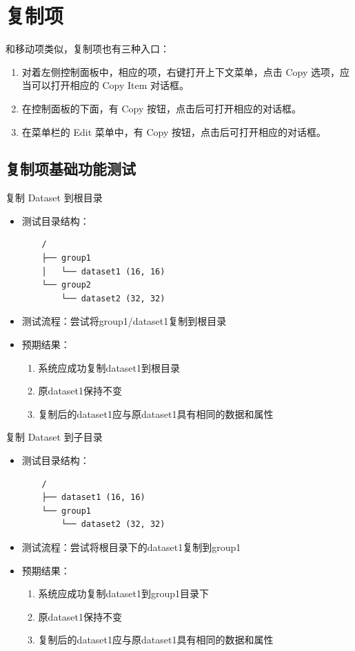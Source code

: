 \documentclass[a4paper,12pt]{report}	%
\begin{document}
\section{复制项}

和移动项类似，复制项也有三种入口：
\begin{enumerate}
    \item 对着左侧控制面板中，相应的项，右键打开上下文菜单，点击 Copy 选项，应当可以打开相应的 Copy Item 对话框。
    \item 在控制面板的下面，有 Copy 按钮，点击后可打开相应的对话框。
    \item 在菜单栏的 Edit 菜单中，有 Copy 按钮，点击后可打开相应的对话框。
\end{enumerate}

\subsection{复制项基础功能测试}
复制 Dataset 到根目录
\begin{itemize}
    \item 测试目录结构：
    \begin{verbatim}
    /
    ├── group1
    │   └── dataset1 (16, 16)
    └── group2
        └── dataset2 (32, 32)
    \end{verbatim}
    \item 测试流程：尝试将group1/dataset1复制到根目录
    \item 预期结果：
    \begin{enumerate}
        \item 系统应成功复制dataset1到根目录
        \item 原dataset1保持不变
        \item 复制后的dataset1应与原dataset1具有相同的数据和属性
    \end{enumerate}
\end{itemize}

复制 Dataset 到子目录
\begin{itemize}
    \item 测试目录结构：
    \begin{verbatim}
    /
    ├── dataset1 (16, 16)
    └── group1
        └── dataset2 (32, 32)
    \end{verbatim}
    \item 测试流程：尝试将根目录下的dataset1复制到group1
    \item 预期结果：
    \begin{enumerate}
        \item 系统应成功复制dataset1到group1目录下
        \item 原dataset1保持不变
        \item 复制后的dataset1应与原dataset1具有相同的数据和属性
    \end{enumerate}
\end{itemize}
\end{document}
